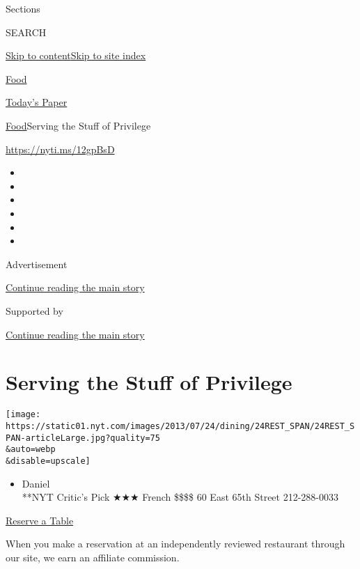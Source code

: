 Sections

SEARCH

\protect\hyperlink{site-content}{Skip to
content}\protect\hyperlink{site-index}{Skip to site index}

\href{https://www.nytimes.com/section/food}{Food}

\href{https://myaccount.nytimes.com/auth/login?response_type=cookie\&client_id=vi}{}

\href{https://www.nytimes.com/section/todayspaper}{Today's Paper}

\href{/section/food}{Food}\textbar{}Serving the Stuff of Privilege

\url{https://nyti.ms/12gpBsD}

\begin{itemize}
\item
\item
\item
\item
\item
\item
\end{itemize}

Advertisement

\protect\hyperlink{after-top}{Continue reading the main story}

Supported by

\protect\hyperlink{after-sponsor}{Continue reading the main story}

\hypertarget{serving-the-stuff-of-privilege}{%
\section{Serving the Stuff of
Privilege}\label{serving-the-stuff-of-privilege}}

\texttt{[image: https://static01.nyt.com/images/2013/07/24/dining/24REST\_SPAN/24REST\_SPAN-articleLarge.jpg?quality=75\\\&auto=webp\\\&disable=upscale]}

\begin{itemize}
\tightlist
\item
  Daniel\\
  **NYT Critic's Pick ★★★ French \$\$\$\$ 60 East 65th Street
  212-288-0033
\end{itemize}

\href{http://www.opentable.com/single.aspx?ref=4201\&rid=337}{Reserve a
Table}

When you make a reservation at an independently reviewed restaurant
through our site, we earn an affiliate commission.

